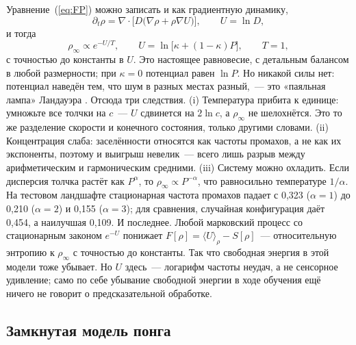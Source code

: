 \documentclass[pre,twocolumn,superscriptaddress,showpacs=false,amsmath,amssymb,nofootinbib]{revtex4-2}
\begin{document}
Уравнение~(\ref{eq:FP}) можно записать и как градиентную динамику,
\begin{equation}
\partial_t\rho=\nabla\cdot\bigl[D\bigl(\nabla\rho+\rho\nabla U\bigr)\bigr],\qquad U=\ln D ,
\end{equation}
и тогда
\begin{equation}
\rho_\infty\propto e^{-U/T},\qquad U=\ln\bigl[\kappa+(1-\kappa)P\bigr],\qquad T=1 ,
\label{eq:boltz}
\end{equation}
с точностью до константы в $U$. Это настоящее равновесие, с детальным балансом в любой размерности; при $\kappa=0$ потенциал равен $\ln P$. Но никакой силы нет: потенциал наведён тем, что шум в разных местах разный,~--- это «паяльная лампа» Ландауэра \cite{Landauer1988}. Отсюда три следствия. (i) Температура прибита к единице: умножьте все толчки на $c$~--- $U$ сдвинется на $2\ln c$, а $\rho_\infty$ не шелохнётся. Это то же разделение скорости и конечного состояния, только другими словами. (ii) Концентрация слаба: заселённости относятся как частоты промахов, а не как их экспоненты, поэтому и выигрыш невелик~--- всего лишь разрыв между арифметическим и гармоническим средними. (iii) Систему можно охладить. Если дисперсия толчка растёт как $P^\alpha$, то $\rho_\infty\propto P^{-\alpha}$, что равносильно температуре $1/\alpha$. На тестовом ландшафте стационарная частота промахов падает с 0{,}323 ($\alpha=1$) до 0{,}210 ($\alpha=2$) и 0{,}155 ($\alpha=3$); для сравнения, случайная конфигурация даёт 0{,}454, а наилучшая 0{,}109. И последнее. Любой марковский процесс со стационарным законом $e^{-U}$ понижает $F[\rho]=\langle U\rangle_\rho-S[\rho]$~--- относительную энтропию к $\rho_\infty$ с точностью до константы. Так что свободная энергия в этой модели тоже убывает. Но $U$ здесь~--- логарифм частоты неудач, а не сенсорное удивление; само по себе убывание свободной энергии в ходе обучения ещё ничего не говорит о предсказательной обработке.

\subsection{Замкнутая модель понга}
\end{document}
